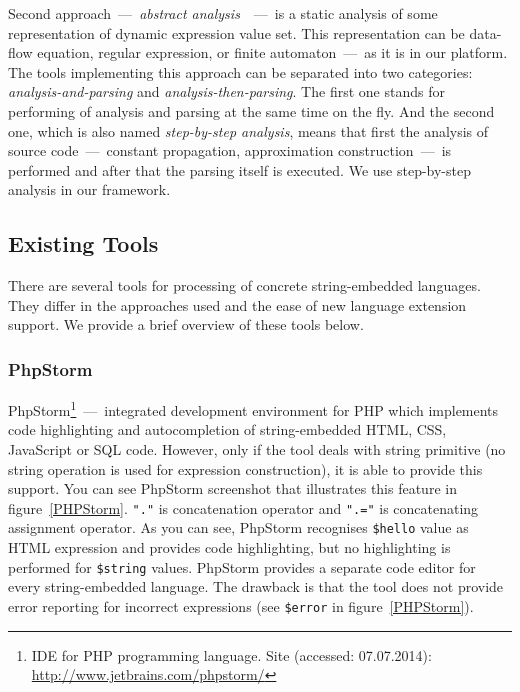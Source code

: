 \documentclass{acm_proc_article-sp}
\begin{document}
Second approach~---~{\it abstract analysis}~\cite{LRAbstrParsing}~---~is a static analysis of some representation of dynamic expression value set. This representation can be data-flow equation, regular expression, or finite automaton~---~as it is in our platform. The tools implementing this approach can be separated into two categories: {\it analysis-and-parsing} and {\it analysis-then-parsing}. The first one stands for performing of analysis and parsing at the same time on the fly. And the second one, which is also named {\it step-by-step analysis}, means that first the analysis of source code~---~constant propagation, approximation construction~---~is performed and after that the parsing itself is executed. We use step-by-step analysis in our framework.


\subsection{Existing Tools}

There are several tools for processing of concrete string-embedded languages. They differ in the approaches used and the ease of new language extension support. We provide a brief overview of these tools below. \newline



\subsubsection{PhpStorm}

PhpStorm\footnote{IDE for PHP programming language. Site (accessed: 07.07.2014): \url{http://www.jetbrains.com/phpstorm/}}~---~integrated development environment for PHP which implements code highlighting and autocompletion of string-embedded HTML, CSS, JavaScript or SQL code. However, only if the tool deals with string primitive (no string operation is used for expression construction), it is able to provide this support. You can see PhpStorm screenshot that illustrates this feature in figure~\ref{PHPStorm}. \verb|"."| is concatenation operator and \verb|".="| is concatenating assignment operator. As you can see, PhpStorm recognises \verb|$hello| value as HTML expression and provides code highlighting, but no highlighting is performed for \verb|$string| values. PhpStorm provides a separate code editor for every string-embedded language. The drawback is that the tool does not provide error reporting for incorrect expressions (see \verb|$error| in figure~\ref{PHPStorm}).
\end{document}
